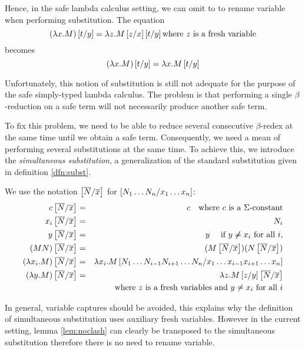 Hence, in the safe lambda calculus setting, we can omit to to rename
variable when performing substitution. The equation
$$(\lambda x . M) \left[ t/y \right] = \lambda z . M \left[ z/x \right]
\left[ t/y \right] \mbox{where $z$ is a fresh variable}$$ becomes
$$(\lambda x . M) \left[ t/y \right] = \lambda x . M \left[ t/y \right]$$



Unfortunately, this notion of substitution is still not adequate for
the purpose of the safe simply-typed lambda calculus. The problem is
that performing a single $\beta$-reduction on a safe term will not
necessarily produce another safe term.

To fix this problem, we need to be able to reduce several
consecutive $\beta$-redex at the same time until we obtain a safe
term. Consequently, we need a mean of performing several
substitutions at the same time. To achieve this, we introduce the
\emph{simultaneous substitution},
 a generalization of the standard substitution given in definition \ref{dfn:subst}.

\begin{dfn}
\label{dnf:simsubst}
 We use the notation
$\left[ \overline{N}/\overline{x} \right]$ for $\left[ N_1 \ldots N_n/x_1
\ldots x_n \right]$:
\begin{eqnarray*}
c \left[ \overline{N}/\overline{x} \right] &=& c \quad \mbox{where $c$ is a $\Sigma$-constant}\\
x_i \left[ \overline{N}/\overline{x} \right] &=& N_i\\
 y \left[ \overline{N}/\overline{x} \right] &=& y \quad \mbox{ if } y \not \neq x_i \mbox{ for all } i,\\
(M N) \left[ \overline{N}/\overline{x} \right] &=& (M \left[ \overline{N}/\overline{x} \right]) (N \left[ \overline{N}/\overline{x} \right]) \\
(\lambda x_i . M) \left[ \overline{N}/\overline{x} \right] &=& \lambda x_i
. M
\left[ N_1 \ldots N_{i-1} N_{i+1}\ldots N_n/x_1 \ldots x_{i-1} x_{i+1}\ldots x_n \right] \\
(\lambda y . M)
\left[ \overline{N}/\overline{x} \right] &=& \lambda z . M \left[ z/y \right] \left[ \overline{N}/\overline{x} \right] \\
&& \mbox{where $z$ is a fresh variables and } y \neq x_i \mbox{ for
all } i
\end{eqnarray*}
\end{dfn}

In general, variable captures should be avoided, this explains why
the definition of simultaneous substitution uses auxiliary fresh
variables. However in the current setting, lemma \ref{lem:noclash}
can clearly be transposed to the simultaneous substitution therefore
there is no need to rename variable.

